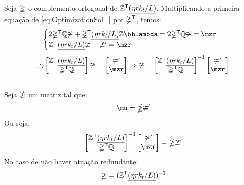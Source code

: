 \documentclass[a4paper,11pt,brazil,fleqn]{article}
\begin{document}
Seja $\mathbb{\Psi}$ o complemento ortogonal de $\mathbb{Z}^{\mathsf{T}}  \underline{(\eta r k_t / L)}$. Multiplicando a primeira equa\c{c}\~ao de \eqref{eq:OptimizationSol_} por $\mathbb{\Psi}^{\mathsf{T}}$, temos:
\begin{equation} \label{eq:OptimizationSol_2}
\begin{cases}
2 \mPsi^\msT \mQ \mup + \mPsi^\msT \underline{(\eta r k_t / L)} \mZ \mlambda = 2 \mPsi^\msT \mQ \mup = \mzr \\
\mZ^\msT  \underline{(\eta r k_t / L)} \mup - \mup' = \mzr
\end{cases}
\end{equation}
\begin{equation} \label{eq:OptimizationSol_3}
\therefore
\begin{bmatrix}
\mZ^\msT  \underline{(\eta r k_t / L)} \\
\mPsi^\msT \mQ
\end{bmatrix}
\mup = 
\begin{bmatrix}
\mup' \\
\mzr
\end{bmatrix}
\Rightarrow
\mup =
\begin{bmatrix}
\mZ^\msT  \underline{(\eta r k_t / L)} \\
\mPsi^\msT \mQ
\end{bmatrix}^\msI
\begin{bmatrix}
\mup' \\
\mzr
\end{bmatrix}
\end{equation} \\

Seja $\mathbb{\Lambda}$ um matriz tal que:
\begin{equation} \label{eq:mupexplicito}
\mu = \mLambda \mup'
\end{equation}
Ou seja:
\begin{equation}
\begin{bmatrix}
\mZ^\msT  \underline{(\eta r k_t / L)} \\
\mPsi^\msT \mQ
\end{bmatrix}^\msI
\begin{bmatrix}
\mup' \\
\mzr
\end{bmatrix}
= \mLambda \mup'
\end{equation}
No caso de n\~ao haver atua\c{c}\~ao redundante:
\begin{equation}
\mathbb{\Lambda} = ( \mathbb{Z}^{\mathsf{T}}  \underline{(\eta r k_t / L)} )^{\mathsf{-1}}
\end{equation}
\end{document}
